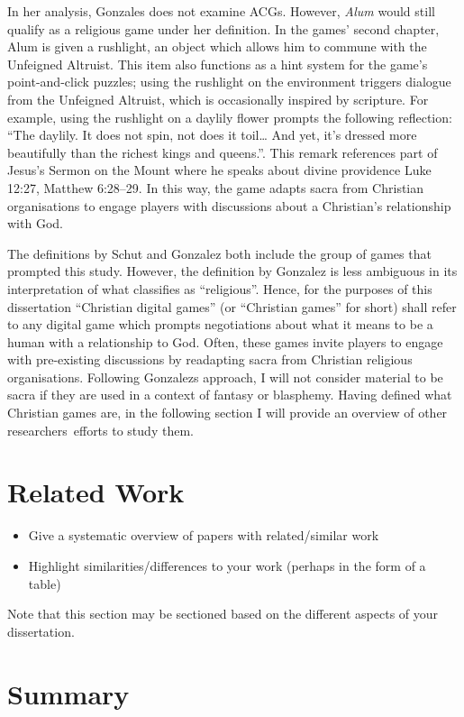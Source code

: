 
In her analysis, Gonzales does not examine \acp{ACG}. However, \textit{Alum} would still qualify as a religious game under her definition. In the games' second chapter, Alum is given a rushlight, an object which allows him to commune with the Unfeigned Altruist. This item also functions as a hint system for the game's point-and-click puzzles; using the rushlight on the environment triggers dialogue from the Unfeigned Altruist, which is occasionally inspired by scripture. For example, using the rushlight on a daylily flower prompts the following reflection: ``The daylily. It does not spin, not does it toil… And yet, it’s dressed more beautifully than the richest kings and queens.''. This remark references part of Jesus's Sermon on the Mount where he speaks about divine providence Luke 12:27, Matthew 6:28–29. In this way, the game adapts sacra from Christian organisations to engage players with discussions about a Christian's relationship with God.

The definitions by Schut and Gonzalez both include the group of games that prompted this study. However, the definition by Gonzalez is less ambiguous in its interpretation of what classifies as ``religious''. Hence, for the purposes of this dissertation ``Christian digital games'' (or ``Christian games'' for short) shall refer to any digital game which prompts negotiations about what it means to be a human with a relationship to God. Often, these games invite players to engage with pre-existing discussions by readapting sacra from Christian religious organisations.  Following Gonzalez\textquotesingle s approach, I will not consider material to be sacra if they are used in a context of fantasy or blasphemy. Having defined what Christian games are, in the following section I will provide an overview of other researchers\textquotesingle \  efforts to study them.
\section{Related Work}

  \begin{itemize}
   \item Give a systematic overview of papers with related/similar work
   \item Highlight similarities/differences to your work (perhaps in the form of a table)
  \end{itemize}

  Note that this section may be sectioned based on the different aspects of your dissertation.
\fi

\section{Summary}
\blindtext
